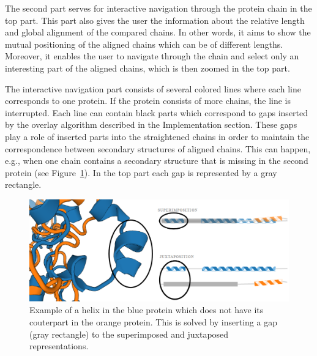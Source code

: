 \documentclass[twocolumn]{bmcart}%
\begin{document}
The second part serves for interactive navigation through the protein chain in the top part. 
This part also gives the user the information about the relative length and global alignment of the compared chains.
In other words, it aims to show the mutual positioning of the aligned chains which can be of different lengths.
Moreover, it enables the user to navigate through the chain and select only an interesting part of the aligned chains, which is then zoomed in the top part.

The interactive navigation part consists of several colored lines where each line corresponds to one protein.
If the protein consists of more chains, the line is interrupted.
Each line can contain black parts which correspond to gaps inserted by the overlay algorithm described in the Implementation section.
These gaps play a role of inserted parts into the straightened chains in order to maintain the correspondence between secondary structures of aligned chains. 
This can happen, e.g., when one chain contains a secondary structure that is missing in the second protein (see Figure~\ref{fig:gap}).
In the top part each gap is represented by a gray rectangle.

\begin{figure}[t!]
  \centering
  \includegraphics[width=0.9\linewidth]{pics/gap2.png}
  \caption{Example of a helix in the blue protein which does not have its couterpart in the orange protein. This is solved by inserting a gap (gray rectangle) to the superimposed and juxtaposed representations.}
  \label{fig:gap}
\end{figure}
\end{document}
